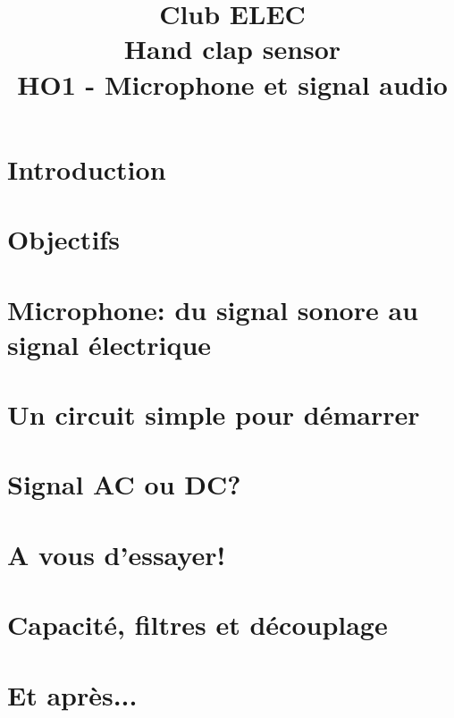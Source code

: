 \documentclass[a4paper,10pt,twoside]{article}
\title{	
	\vspace{2.5cm}
	\normalfont \normalsize 
	\huge Club ELEC\\ 
	\vspace{2.5cm}
	\huge Hand clap sensor\\
	\vspace{.25cm}
	\Large HO1 - Microphone et signal audio
	\vspace{2.5cm}
	\centering
}
\begin{document}
\renewcommand{\figurename}{Figure}
\renewcommand{\thepage}{\roman{page}}
\setcounter{page}{1}

\maketitle
\newpage
{}
\pagestyle{main}

\newpage
\null
\thispagestyle{empty}
\newpage
\clearpage

\setcounter{page}{1}

\section*{Introduction}


\section*{Objectifs}


\section{Microphone: du signal sonore au signal électrique}


\section{Un circuit simple pour démarrer}


\section{Signal AC ou DC?}


\section{A vous d'essayer!}


\section{Capacité, filtres et découplage}


\section{Et après...}

\end{document}
